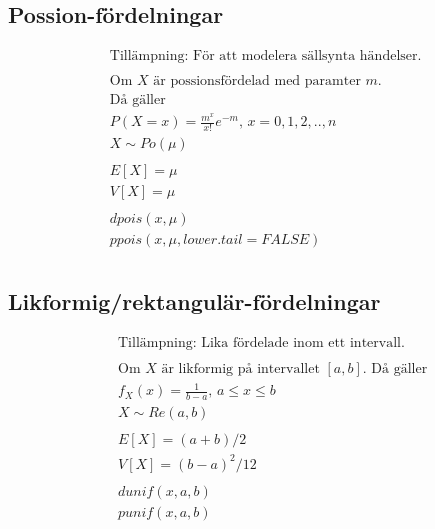 \begin{multicols}{2}
\subsection{Possion-fördelningar}
\begin{align*}
  &\text{Tillämpning: För att modelera sällsynta händelser.} \\
  &\\
  &\text{Om $X$ är possionsfördelad med paramter $m$.} \\
  &\text{Då gäller} \\
  &P(X=x) = \frac{m^x}{x!}e^{-m}, \, x=0,1,2,..,n  \\
  &X \sim Po(\mu) \\
  &\\
  &E[X]=\mu \\
  &V[X]=\mu \\
  &\\
  &dpois(x, \mu) \\
  &ppois(x, \mu, lower.tail = FALSE) \\
\end{align*}

\subsection{Likformig/rektangulär-fördelningar}
\begin{align*}
  &\quad  \text{Tillämpning: Lika fördelade inom ett intervall.} \\
  &\quad  \\
  &\quad  \text{Om $X$ är likformig på intervallet $[a,b]$. Då gäller} \\
  &\quad  f_X(x) = \frac{1}{b-a}, \, a\leq{x}\leq{b} \\
  &\quad  X \sim Re(a,b) \\
  &\quad  \\
  &\quad  E[X]=(a+b)/2 \\
  &\quad  V[X]=(b-a)^2/12 \\
  &\quad  \\
  &\quad  dunif(x, a, b) \\
  &\quad  punif(x, a, b) \\
\end{align*}


\end{multicols}
